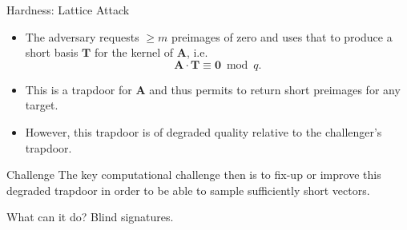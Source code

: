 \documentclass[xcolor=table,10pt,aspectratio=169]{beamer}
\renewcommand{\vec}[1]{\ensuremath{\mathbf{#1}}\xspace}
\providecommand{\mat}[1]{\ensuremath{\vec{#1}}\xspace}
\begin{document}
\begin{frame}[label={sec:org1cc496a}]{Hardness: Lattice Attack}
\begin{itemize}
\item The adversary requests \(\geq m\) preimages of zero and uses that to produce a short basis \(\mat{T}\) for the kernel of \(\mat{A}\), i.e. 
\[
  \mat{A}\cdot\mat{T} \equiv \vec{0} \bmod q.
  \]
\item This is a trapdoor for \(\mat{A}\) and thus permits to return short preimages for any target.
\item However, this trapdoor is of degraded quality relative to the challenger's trapdoor.
\end{itemize}

\begin{alertblock}{Challenge}
The key computational challenge then is to fix-up or improve this degraded trapdoor in order to be able to sample sufficiently short vectors.
\end{alertblock}
\end{frame}

\begin{frame}[label={sec:org37e7252}]{What can it do?}
Blind signatures.
\end{frame}
\end{document}
